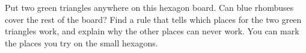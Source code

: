 \documentclass[12pt]{extarticle}
\begin{document}
\newpage
\prob Put two green triangles  anywhere on this hexagon board. Can blue rhombuses  cover the rest of the board? Find a rule that tells which places for the two green triangles work, and explain why the other places can never work. You can mark the places you try on the small hexagons.

\vspace{14pt}
\begin{center}

\vspace{20pt}
\hspace{0.3in}\hspace{0.3in}\hspace{0.3in}\hspace{0.3in}

\vspace{14pt}
\hspace{0.3in}\hspace{0.3in}\hspace{0.3in}\hspace{0.3in}
\end{center}

\vspace{4pt}
\end{document}
